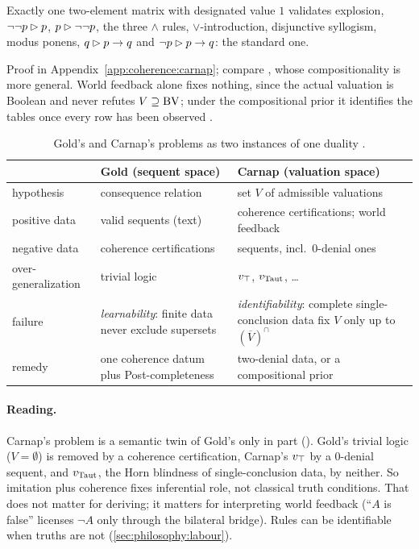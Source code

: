 \begin{proposition}\label{prop:coherence:compositional}
Exactly one two-element matrix with designated value $1$ validates explosion, $\neg\neg p\rhd p$, $p\rhd\neg\neg p$, the three $\wedge$ rules, $\vee$-introduction, disjunctive syllogism, modus ponens, $q\rhd p\to q$ and $\neg p\rhd p\to q$: the standard one.
\end{proposition}

Proof in Appendix~\ref{app:coherence:carnap}; compare \citet{bonnay2016compositionality}, whose compositionality is more general. World feedback alone fixes nothing, since the actual valuation is Boolean and never refutes $V\supseteq\mathrm{BV}$; under the compositional prior it identifies the tables once every row has been observed .

\begin{table}[t]
\centering\small
\begin{tabularx}{\textwidth}{@{}lXX@{}}
\toprule
 & Gold (sequent space) & Carnap (valuation space)\\
\midrule
hypothesis & consequence relation & set $V$ of admissible valuations\\
positive data & valid sequents (text) & coherence certifications; world feedback\\
negative data & coherence certifications & sequents, incl.\ 0-denial ones\\
over-generalization & trivial logic & $v_{\top}$, $v_{\mathrm{Taut}}$, \dots\\
failure & \emph{learnability}: finite data never exclude supersets & \emph{identifiability}: complete single-conclusion data fix $V$ only up to $(\overline V)^\cap$\\
remedy & one coherence datum plus Post-completeness & two-denial data, or a compositional prior\\
\bottomrule
\end{tabularx}
\caption{Gold's and Carnap's problems as two instances of one duality .}
\label{tab:coherence:goldcarnap}
\end{table}

\paragraph{Reading.} Carnap's problem is a semantic twin of Gold's only in part (). Gold's trivial logic ($V=\emptyset$) is removed by a coherence certification, Carnap's $v_{\top}$ by a 0-denial sequent, and $v_{\mathrm{Taut}}$, the Horn blindness of single-conclusion data, by neither. So imitation plus coherence fixes inferential role, not classical truth conditions. That does not matter for deriving; it matters for interpreting world feedback (``$A$ is false'' licenses $\neg A$ only through the bilateral bridge). Rules can be identifiable when truths are not (\cref{sec:philosophy:labour}).

